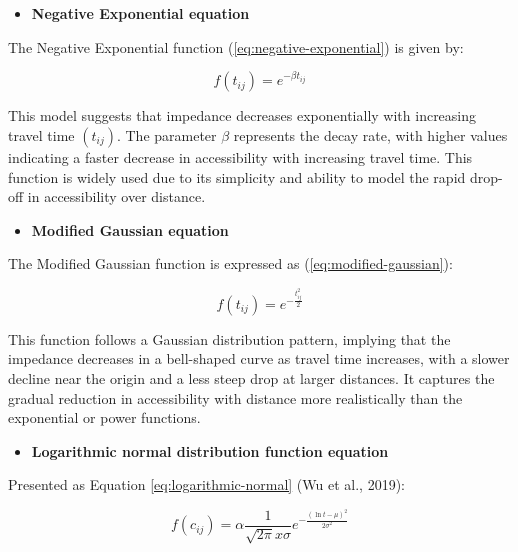 \documentclass[
11pt, %
oneside, %
english, %
singlespacing, %
]{macthesis} %
\def\tightlist{}
\begin{document}
\begin{itemize}
\tightlist
\item
  \textbf{Negative Exponential equation}
\end{itemize}

The Negative Exponential function (\ref{eq:negative-exponential}) is given by:

\begin{equation}
f(t_{ij}) = e^{-\beta t_{ij}}
\label{eq:negative-exponential}
\end{equation}

This model suggests that impedance decreases exponentially with increasing travel time \((t_{ij})\). The parameter \(\beta\) represents the decay rate, with higher values indicating a faster decrease in accessibility with increasing travel time. This function is widely used due to its simplicity and ability to model the rapid drop-off in accessibility over distance.

\begin{itemize}
\tightlist
\item
  \textbf{Modified Gaussian equation}
\end{itemize}

The Modified Gaussian function is expressed as (\ref{eq:modified-gaussian}):

\begin{equation}
f(t_{ij}) = e^{-\frac{t_{ij}^2}{2}}
\label{eq:modified-gaussian}
\end{equation}

This function follows a Gaussian distribution pattern, implying that the impedance decreases in a bell-shaped curve as travel time increases, with a slower decline near the origin and a less steep drop at larger distances. It captures the gradual reduction in accessibility with distance more realistically than the exponential or power functions.

\begin{itemize}
\tightlist
\item
  \textbf{Logarithmic normal distribution function equation}
\end{itemize}

Presented as Equation \ref{eq:logarithmic-normal} (Wu et al., 2019):

\begin{equation}
f(c_{ij}) = \alpha \frac{1}{\sqrt{2\pi} x \sigma} e^{-\frac{(\ln t - \mu)^2}{2\sigma^2}}
\label{eq:logarithmic-normal}
\end{equation}
\end{document}
